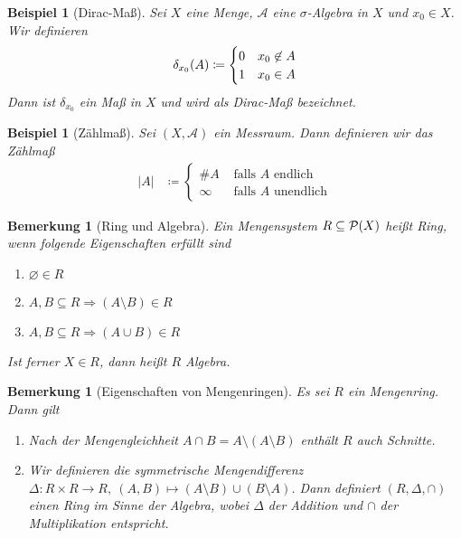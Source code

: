\documentclass[11pt, twoside, a4paper]{article}
\theoremstyle{plain}
\newtheorem{bemerkung}[blockelement]{Bemerkung}
\newtheorem{beispiel}[blockelement]{Beispiel}
\numberwithin{equation}{subsection}
\newcommand{\pair}[1]{\left(#1\right)}
\newcommand{\of}[1]{\mathopen{}\mathclose{}\bgroup\left(#1\aftergroup\egroup\right)}
\newcommand{\abs}[1]{\left\lvert#1\right\rvert}
\newcommand{\impl}[0]{\Rightarrow{}}
\renewcommand{\emptyset}{\varnothing}
\newcommand{\anf}[1]{\glqq{}#1\grqq}
\newcommand{\mA}{\mathcal{A}}
\begin{document}
    \begin{beispiel}[Dirac-Maß]
        Sei $X$ eine Menge, $\mA$ eine $\sigma$-Algebra in $X$ und $x_0\in X$. Wir definieren
        \begin{align*}
            \delta_{x_0}\of{A} \coloneqq \begin{cases}
                                             0 &x_0\not\in A\\
                                             1 &x_0\in A
            \end{cases}
        \end{align*}
        Dann ist $\delta_{x_0}$ ein Maß in $X$ und wird als \textit{Dirac}-Maß bezeichnet.
    \end{beispiel}

    \begin{beispiel}[Zählmaß]
        Sei $\pair{X, \mA}$ ein Messraum. Dann definieren wir das Zählmaß
        \begin{align*}
            \abs{A} &\coloneqq \begin{cases}
                                   \#A &\text{ falls $A$ endlich}\\
                                   \infty &\text{ falls $A$ unendlich}
            \end{cases}
        \end{align*}
    \end{beispiel}

    \begin{bemerkung}[Ring und Algebra]
        \marginnote{[28. Okt]}
        Ein Mengensystem $R \subseteq\mathcal{P}\of{X}$ heißt Ring, wenn folgende Eigenschaften erfüllt sind
        \begin{enumerate}[label=($\text{R}_{\arabic*}$)]
            \item $\emptyset\in R$
            \item $A, B\subseteq R \impl \pair{A \setminus B} \in R$
            \item $A, B\subseteq R \impl \pair{A \cup B} \in R$
        \end{enumerate}
        Ist ferner $X\in R$, dann heißt $R$ Algebra.
    \end{bemerkung}

    \begin{bemerkung}[Eigenschaften von Mengenringen]
        Es sei $R$ ein Mengenring. Dann gilt
        \begin{enumerate}
            \item Nach der Mengengleichheit $A \cap B = A \setminus \pair{A \setminus B}$ enthält $R$ auch Schnitte.
            \item Wir definieren die symmetrische Mengendifferenz $\Delta: R \times R \to R,~\pair{A, B} \mapsto \pair{A\setminus B} \cup \pair{B\setminus A}$. Dann definiert $\pair{R, \Delta, \cap}$ einen Ring im Sinne der Algebra, wobei $\Delta$ der \anf{Addition} und $\cap$ der \anf{Multiplikation} entspricht.
        \end{enumerate}
    \end{bemerkung}
\end{document}
